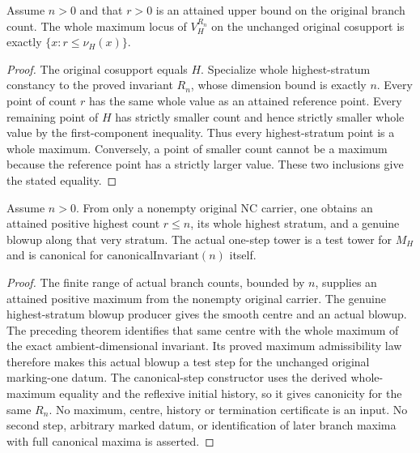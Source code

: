 \begin{theorem}
\label{hir:general-nc-ambient-canonical-initial-full-maximum}
\leanok
{}
Assume $n>0$ and that $r>0$ is an attained upper bound on the original
branch count. The whole maximum locus of $V^{R_n}_H$ on the unchanged
original cosupport is exactly $\{x:r\leq\nu_H(x)\}$.
\end{theorem}
\begin{proof}
The original cosupport equals $H$. Specialize whole highest-stratum
constancy to the proved invariant $R_n$, whose dimension bound is exactly
$n$. Every point of count $r$ has the same whole value as an attained
reference point. Every remaining point of $H$ has strictly smaller count
and hence strictly smaller whole value by the first-component inequality.
Thus every highest-stratum point is a whole maximum. Conversely, a point
of smaller count cannot be a maximum because the reference point has a
strictly larger value. These two inclusions give the stated equality.
\end{proof}

\begin{theorem}
\label{hir:general-nc-original-ambient-canonical-first-step}
\leanok
{}
Assume $n>0$. From only a nonempty original NC carrier, one obtains an
attained positive highest count $r\leq n$, its whole highest stratum,
and a genuine blowup along that very stratum. The actual one-step tower
is a test tower for $M_H$ and is canonical for
$\mathrm{canonicalInvariant}(n)$ itself.
\end{theorem}
\begin{proof}
The finite range of actual branch counts, bounded by $n$, supplies an
attained positive maximum from the nonempty original carrier. The genuine
highest-stratum blowup producer gives the smooth centre and an actual
blowup. The preceding theorem identifies that same centre with the whole
maximum of the exact ambient-dimensional invariant. Its proved maximum
admissibility law therefore makes this actual blowup a test step for
the unchanged original marking-one datum. The canonical-step constructor
uses the derived whole-maximum equality and the reflexive initial history,
so it gives canonicity for the same $R_n$. No maximum, centre, history or
termination certificate is an input. No second step, arbitrary marked
datum, or identification of later branch maxima with full canonical
maxima is asserted.
\end{proof}
